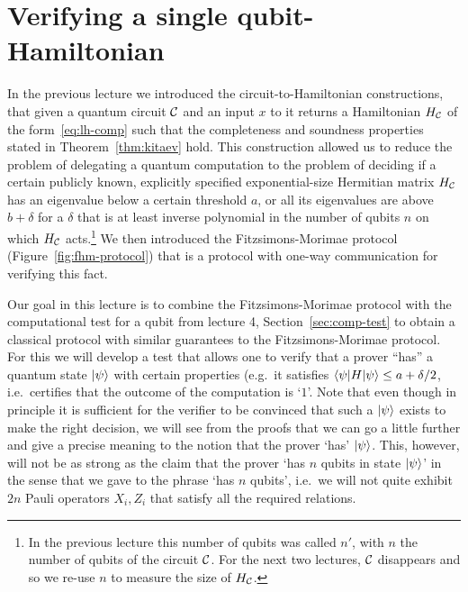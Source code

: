 \chapter{Verifying a single qubit-Hamiltonian}

In the previous lecture we introduced the circuit-to-Hamiltonian constructions, that given a quantum circuit $\mathcal{C}$ and an input $x$ to it returns a Hamiltonian $H_{\mathcal{C}}$ of the form~\eqref{eq:lh-comp} such that the completeness and soundness properties stated in Theorem~\ref{thm:kitaev} hold. This construction allowed us to reduce the problem of delegating a quantum computation to the problem of deciding if a certain publicly known, explicitly specified exponential-size Hermitian matrix $H_{\mathcal{C}}$ has an eigenvalue below a certain threshold $a$, or all its eigenvalues are above $b+\delta$ for a $\delta$ that is at least inverse polynomial in the number of qubits $n$ on which $H_{\mathcal{C}}$ acts.\footnote{In the previous lecture this number of qubits was called $n'$, with $n$ the number of qubits of the circuit $\mathcal{C}$. For the next two lectures, $\mathcal{C}$ disappears and so we re-use $n$ to measure the size of $H_{\mathcal{C}}$.} We then introduced the Fitzsimons-Morimae protocol (Figure~\ref{fig:fhm-protocol}) that is a protocol with one-way communication for verifying this fact. 

Our goal in this lecture is to combine the Fitzsimons-Morimae protocol with the computational test for a qubit from lecture 4, Section~\ref{sec:comp-test} to obtain a classical protocol with similar guarantees to the Fitzsimons-Morimae protocol. For this we will develop a test that allows one to verify that a prover ``has'' a quantum state $|\psi\rangle$ with certain properties (e.g.\ it satisfies $\langle\psi|H|\psi\rangle \leq a + \delta/2$, i.e.\ certifies that the outcome of the computation is `$1$'. Note that even though in principle it is sufficient for the verifier to be convinced  that such a $|\psi\rangle$ exists to make the right decision, we will see from the proofs that we can go a little further and give a precise meaning to the notion that the prover `has' $|\psi\rangle$. This, however, will not be as strong as the claim that the prover `has $n$ qubits in state $|\psi\rangle$' in the sense that we gave to the phrase `has $n$ qubits', i.e.\ we will not quite exhibit $2n$ Pauli operators $X_i,Z_i$ that satisfy all the required relations. 


